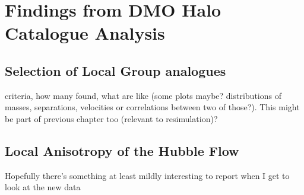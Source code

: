\documentclass[english, oneside]{HYgradu}
\begin{document}
\chapter{Findings from DMO Halo Catalogue Analysis}
\section{Selection of Local Group analogues}
criteria, how many found, what are like (some plots maybe? distributions of masses, separations, velocities or correlations between two of those?). This might be part of previous chapter too (relevant to resimulation)?

\section{Local Anisotropy of the Hubble Flow}
Hopefully there's something at least mildly interesting to report when I get to look at the new data
\end{document}
